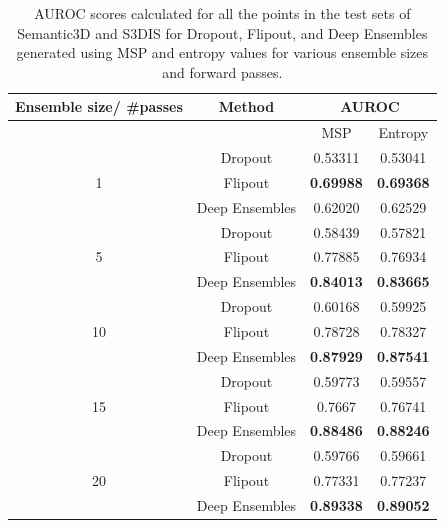     \begin{table}[h!]
        \centering
        \begin{tabular}{cccc}
        \hline
        Ensemble size/ \#passes & Method               &  \multicolumn{2}{c}{AUROC}          \\ \hline
                                &                      &  MSP              & Entropy         \\ \hline
        \multirow{3}{*}{1}      & Dropout              & 0.53311          & 0.53041          \\
                                & Flipout              & \textbf{0.69988} & \textbf{0.69368} \\
                                & Deep Ensembles       & 0.62020          & 0.62529          \\ \hline
        \multirow{3}{*}{5}      & Dropout              & 0.58439          & 0.57821          \\
                                & Flipout              & 0.77885          & 0.76934          \\
                                & Deep Ensembles       & \textbf{0.84013} & \textbf{0.83665} \\ \hline
        \multirow{3}{*}{10}     & Dropout              & 0.60168          & 0.59925          \\
                                & Flipout              & 0.78728          & 0.78327          \\
                                & Deep Ensembles       & \textbf{0.87929} & \textbf{0.87541} \\ \hline
        \multirow{3}{*}{15}     & Dropout              & 0.59773          & 0.59557          \\
                                & Flipout              & 0.7667           & 0.76741          \\
                                & Deep Ensembles       & \textbf{0.88486} & \textbf{0.88246} \\ \hline
        \multirow{3}{*}{20}     & Dropout              & 0.59766          & 0.59661          \\
                                & Flipout              & 0.77331          & 0.77237          \\
                                & Deep Ensembles       & \textbf{0.89338} & \textbf{0.89052} \\ \hline
        \end{tabular}
        \caption{AUROC scores calculated for all the points in the test sets of Semantic3D and S3DIS for Dropout, Flipout, and  Deep Ensembles generated using MSP and entropy values for various ensemble sizes and forward passes.}
        \label{tab:sem3dvs3dis_auroc}
    \end{table}
